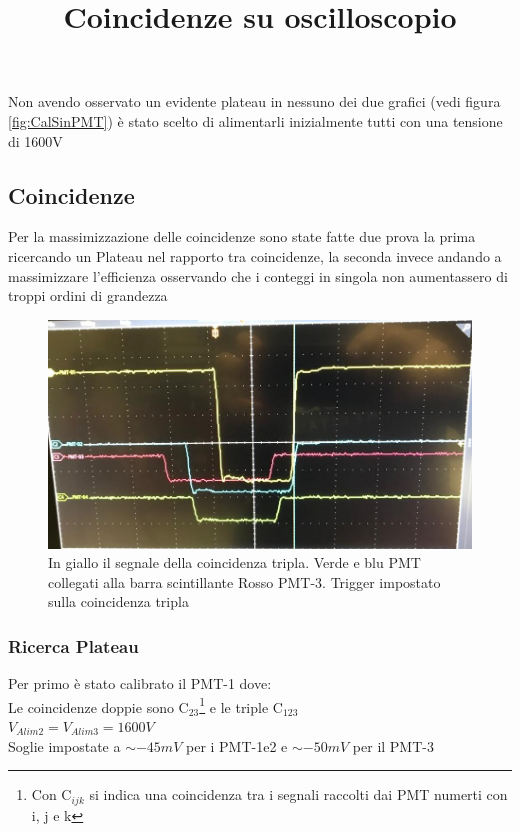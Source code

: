 \documentclass[a4paper]{article}
\begin{document}
Non avendo osservato un evidente plateau in nessuno dei due grafici (vedi figura \ref{fig:CalSinPMT}) è stato scelto di alimentarli inizialmente tutti con una tensione di 1600V

\subsection{Coincidenze}
\label{sec:Coinc}
Per la massimizzazione delle coincidenze sono state fatte due prova la prima ricercando un Plateau nel rapporto tra coincidenze, la seconda invece andando a massimizzare l'efficienza osservando che i conteggi in singola non aumentassero di troppi ordini di grandezza

\begin{figure}
\centering
\title{Coincidenze su oscilloscopio}
\begin{center}
\includegraphics[scale=0.35]{./immagini/TimeOfFlight/CoincOscill.jpg}
\caption{In giallo il segnale della coincidenza tripla. Verde e blu PMT collegati alla barra scintillante Rosso PMT-3. Trigger impostato sulla coincidenza tripla}
\label{fig:ExCoinc}
\end{center}
\end{figure}

\subsubsection{Ricerca Plateau}
Per primo è stato calibrato il PMT-1 dove:\\
Le coincidenze doppie sono C$_{23}$\footnote{Con C$_{ijk}$ si indica una coincidenza tra i segnali raccolti dai PMT numerti con i, j e k} e le triple C$_{123}$\\
$V_{Alim2}=V_{Alim3}=1600V$\\
Soglie impostate a $\sim-45mV$ per i PMT-1e2 e $\sim-50mV$ per il PMT-3
\end{document}
